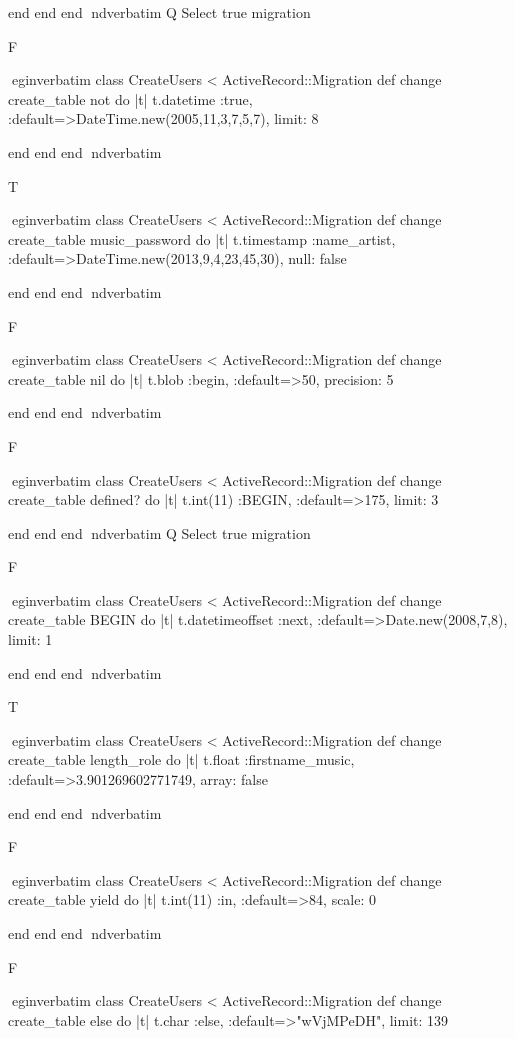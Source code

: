     end 
  end 
end
nd{verbatim}
Q
 Select true migration

F

egin{verbatim}
 class CreateUsers < ActiveRecord::Migration 
  def change 
    create_table not do |t| 
      t.datetime :true, :default=>DateTime.new(2005,11,3,7,5,7), limit: 8
    
    end 
  end 
end
nd{verbatim}

T

egin{verbatim}
 class CreateUsers < ActiveRecord::Migration 
  def change 
    create_table music_password do |t| 
      t.timestamp :name_artist, :default=>DateTime.new(2013,9,4,23,45,30), null: false
    
    end 
  end 
end
nd{verbatim}

F

egin{verbatim}
 class CreateUsers < ActiveRecord::Migration 
  def change 
    create_table nil do |t| 
      t.blob :begin, :default=>50, precision: 5
    
    end 
  end 
end
nd{verbatim}

F

egin{verbatim}
 class CreateUsers < ActiveRecord::Migration 
  def change 
    create_table defined? do |t| 
      t.int(11) :BEGIN, :default=>175, limit: 3
    
    end 
  end 
end
nd{verbatim}
Q
 Select true migration

F

egin{verbatim}
 class CreateUsers < ActiveRecord::Migration 
  def change 
    create_table BEGIN do |t| 
      t.datetimeoffset :next, :default=>Date.new(2008,7,8), limit: 1
    
    end 
  end 
end
nd{verbatim}

T

egin{verbatim}
 class CreateUsers < ActiveRecord::Migration 
  def change 
    create_table length_role do |t| 
      t.float :firstname_music, :default=>3.901269602771749, array: false
    
    end 
  end 
end
nd{verbatim}

F

egin{verbatim}
 class CreateUsers < ActiveRecord::Migration 
  def change 
    create_table yield do |t| 
      t.int(11) :in, :default=>84, scale: 0
    
    end 
  end 
end
nd{verbatim}

F

egin{verbatim}
 class CreateUsers < ActiveRecord::Migration 
  def change 
    create_table else do |t| 
      t.char :else, :default=>"wVjMPeDH", limit: 139
    
